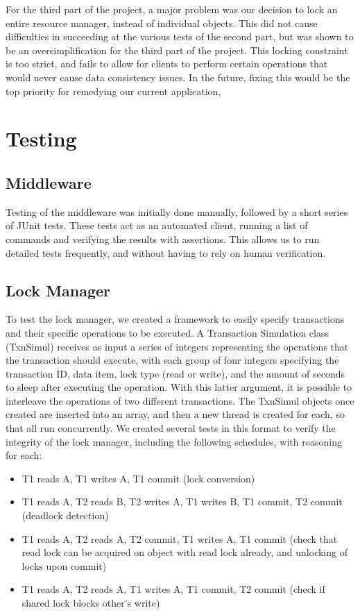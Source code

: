 \documentclass[11pt]{article}
\begin{document}
For the third part of the project, a major problem was our decision to lock an entire resource manager, instead of individual objects. This did not cause difficulties in succeeding at the various tests of the second part, but was shown to be an oversimplification for the third part of the project. This locking constraint is too strict, and fails to allow for clients to perform certain operations that would never cause data consistency issues. In the future, fixing this would be the top priority for remedying our current application,\par

\section*{Testing}

\subsection*{Middleware}

Testing of the middleware was initially done manually, followed by a short series of JUnit tests. These tests act as an automated client, running a list of commands and verifying the results with assertions. This allows us to run detailed tests frequently, and without having to rely on human verification.  \par

\subsection*{Lock Manager}

To test the lock manager, we created a framework to easily specify transactions and their specific operations to be executed. A Transaction Simulation class (TxnSimul) receives as input a series of integers representing the operations that the transaction should execute, with each group of four integers specifying the transaction ID, data item, lock type (read or write), and the amount of seconds to sleep after executing the operation. With this latter argument, it is possible to interleave the operations of two different transactions. The TxnSimul objects once created are inserted into an array, and then a new thread is created for each, so that all run concurrently. We created several tests in this format to verify the integrity of the lock manager, including the following schedules, with reasoning for each:

\begin{itemize}
\item T1 reads A, T1 writes A, T1 commit (lock conversion)
\item T1 reads A, T2 reads B, T2 writes A, T1 writes B, T1 commit, T2 commit (deadlock detection)
\item T1 reads A, T2 reads A, T2 commit, T1 writes A, T1 commit (check that read lock can be acquired on object with read lock already, and unlocking of locks upon commit)
\item T1 reads A, T2 reads A, T1 writes A, T1 commit, T2 commit (check if shared lock blocks other's write)
\end{itemize}
\end{document}
